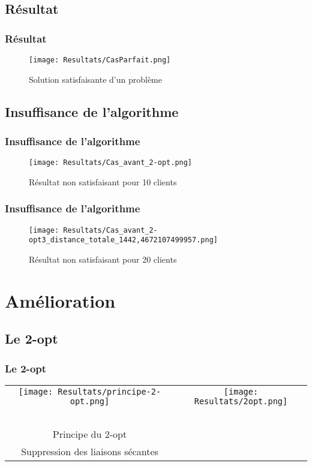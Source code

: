 \documentclass[10pt]{beamer}
\begin{document}
	\subsection{Résultat}

	\begin{frame}
		\frametitle{Résultat}
		\begin{figure}
			\texttt{[image: Resultats/CasParfait.png]}
			\caption{Solution satisfaisante d'un problème}	
		\end{figure}
	\end{frame}

	\subsection{Insuffisance de l'algorithme}
	   
	\begin{frame}
		\frametitle{Insuffisance de l'algorithme}
		\begin{figure}
			\texttt{[image: Resultats/Cas\_avant\_2-opt.png]}
			\caption{Résultat non satisfaisant pour 10 clients}	
		\end{figure}
	\end{frame}

	\begin{frame}
		\frametitle{Insuffisance de l'algorithme}
		\begin{figure}
			\texttt{[image: Resultats/Cas\_avant\_2-opt3\_distance\_totale\_1442,4672107499957.png]}
			\caption{Résultat non satisfaisant pour 20 clients}	
		\end{figure}
	\end{frame}

	\section{Amélioration}

	\subsection{Le 2-opt}

	\begin{frame}
		\frametitle{Le 2-opt}
		\begin{tabular}{cc}
				\texttt{[image: Resultats/principe-2-opt.png]}
				&
				\texttt{[image: Resultats/2opt.png]}
				\\
				\ \\Principe du 2-opt\\Suppression des liaisons sécantes
				&
				\ 
			\end{tabular}
	\end{frame}
\end{document}
